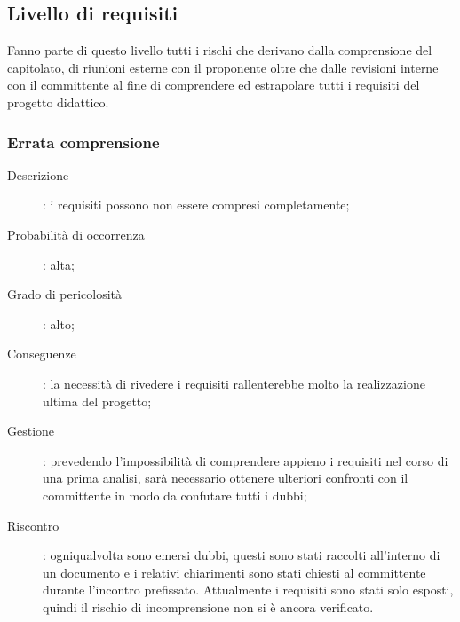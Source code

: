 \documentclass[../PianoDiProgetto.tex]{subfiles}
\begin{document}
	\newpage		
	 \subsection{Livello di requisiti}
	 Fanno parte di questo livello tutti i rischi che derivano dalla comprensione del capitolato, di riunioni esterne con il proponente oltre che dalle revisioni interne con il committente al fine di comprendere ed estrapolare tutti i requisiti del progetto didattico.

	 	\subsubsection{Errata comprensione} 
		\begin{description}
			\item [Descrizione]: i requisiti possono non essere compresi completamente;
			\item [Probabilità di occorrenza]: alta;
			\item [Grado di pericolosità]: alto;
			\item [Conseguenze]: la necessità di rivedere i requisiti rallenterebbe molto la realizzazione ultima del progetto;
			\item [Gestione]: prevedendo l'impossibilità di comprendere appieno i requisiti nel corso di una prima analisi, sarà necessario ottenere ulteriori confronti con il committente in modo da confutare tutti i dubbi;
			\item [Riscontro]: ogniqualvolta sono emersi dubbi, questi sono stati raccolti all'interno di un documento e i relativi chiarimenti sono stati  chiesti al committente durante l'incontro prefissato. Attualmente i requisiti sono stati solo esposti, quindi il rischio di incomprensione non si è ancora verificato.
		\end{description}
\end{document}
